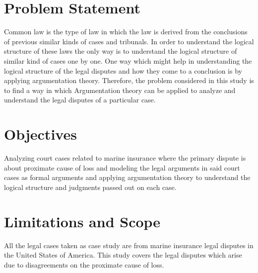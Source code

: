 \section{Problem Statement}

Common law is the type of law in which the law is derived from the conclusions of previous similar
kinds of cases and tribunals. In order to understand the logical structure of these laws the only way
is to understand the logical structure of similar kind of cases one by one. One way which might
help in understanding the logical structure of the legal disputes and how they come to a conclusion
is by applying argumentation theory. Therefore, the problem considered in this study is to find a
way in which Argumentation theory can be applied to analyze and understand the legal disputes of a
particular case.

\section{Objectives}


Analyzing court cases related to marine insurance where the primary dispute is about proximate cause of loss and modeling the legal arguments in said court cases as formal arguments and applying argumentation theory to understand the logical structure and judgments passed out on each case.

\section{Limitations and Scope}

All the legal cases taken as case study are from marine insurance legal disputes in the United States of America. This study covers the legal disputes which arise due to disagreements on the proximate cause of loss.

\FloatBarrier
